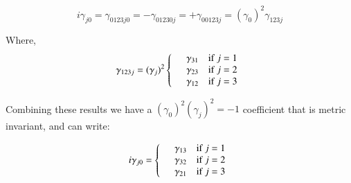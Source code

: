 \documentclass{article}
\begin{document}
\begin{equation*}
i\gamma_{j0} 
= \gamma_{0123j0}
= -\gamma_{01230j}
= +\gamma_{00123j}
= (\gamma_0)^2 \gamma_{123j}
\end{equation*}

Where, 
\begin{equation*}
\gamma_{123j} = 
(\gamma_{j})^2
\left\{ 
\begin{array}{l l}
& \gamma_{31} \quad \mbox{if $j = 1$} \\
& \gamma_{23} \quad \mbox{if $j = 2$} \\
& \gamma_{12} \quad \mbox{if $j = 3$} \\
\end{array} \right.
\end{equation*}

Combining these results we have a $(\gamma_0)^2 (\gamma_{j})^2 = -1$ coefficient that is metric invariant, and can write:

\begin{equation*}
i \gamma_{j0} = 
\left\{ 
\begin{array}{l l}
& \gamma_{13} \quad \mbox{if $j = 1$} \\
& \gamma_{32} \quad \mbox{if $j = 2$} \\
& \gamma_{21} \quad \mbox{if $j = 3$} \\
\end{array} \right.
\end{equation*}
\end{document}
